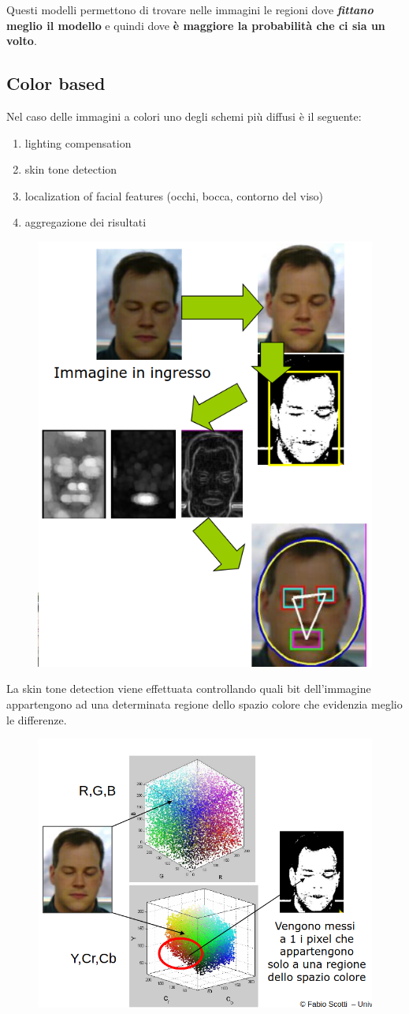 \documentclass{report}
\begin{document}
\noindent Questi modelli permettono di trovare nelle immagini le regioni dove 
\textbf{\textit{fittano} meglio il modello} e quindi dove \textbf{è maggiore 
la probabilità che ci sia un volto}.

\subsection{Color based}
Nel caso delle immagini a colori uno degli schemi più diffusi
è il seguente:
\begin{enumerate}
    \item lighting compensation 
    \item skin tone detection 
    \item localization of facial features (occhi, bocca, contorno del viso)
    \item aggregazione dei risultati
\end{enumerate}

\begin{figure}[ht]
    \centering
    \includegraphics[width=0.58\linewidth]{images/fd-color-based.png}
\end{figure}

\noindent La skin tone detection viene effettuata controllando 
quali bit dell'immagine appartengono ad una determinata
regione dello spazio colore che evidenzia meglio le differenze.

\begin{figure}[ht]
    \centering
    \includegraphics[width=0.7\linewidth]{images/fd-color-based2.png}
\end{figure}
\end{document}
